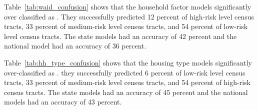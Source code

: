  

Table~\ref{tab:waid_confusion} shows that the household factor models significantly over classified \cts as \lrl. They successfully predicted 12 percent of high-risk level census tracts, 33 percent of medium-risk level census tracts, and 54 percent of low-risk level census tracts. The state models had an accuracy of 42 percent and the national model had an accuracy of 36 percent. 



Table~\ref{tab:hh_type_confusion} shows that the housing type models significantly over-classified \cts as \lrl. they successfully predicted 6 percent of low-risk level census tracts, 33 percent of medium-risk level census tracts, and 54 percent of high-risk census tracts. The state models had an accuracy of 45 percent and the national models had an accuracy of 43 percent. 



\endinput